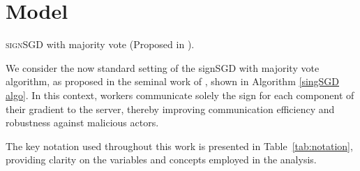 \section{Model}
\label{sec:model}

\begin{algorithm}[ht!]
    \caption{\textsc{signSGD} with majority vote (Proposed in \cite{bernstein2018signsgd}).}
    \label{singSGD algo}
\end{algorithm}

We consider the now standard setting of the signSGD with majority vote algorithm, as proposed in the seminal work of \cite{bernstein2018signsgd}, shown in Algorithm \ref{singSGD algo}. In this context, workers communicate solely the sign for each component of their gradient to the server, thereby improving communication efficiency and robustness against malicious actors. 

The key notation used throughout this work is presented in Table~\ref{tab:notation}, providing clarity on the variables and concepts employed in the analysis.

